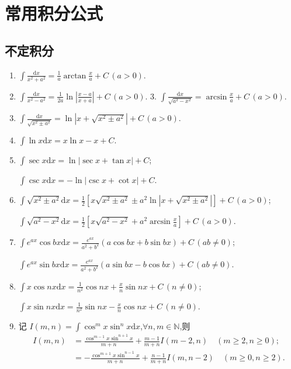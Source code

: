 \documentclass[../../main.tex]{subfiles}
\begin{document}
\section{常用积分公式}

\subsection{不定积分}

\begin{enumerate}
\item $\int\frac{\mathrm{d}x}{x^2+a^2}=\frac{1}{a}\arctan\frac{x}{a}+C\,(a>0)$.
\\
\item $\int\frac{\mathrm{d}x}{x^2-a^2}=\frac{1}{2a}\ln\left|\frac{x-a}{x+a}\right|+C\,(a>0)$.
3. $\int\frac{\mathrm{d}x}{\sqrt{a^2-x^2}}=\arcsin\frac{x}{a}+C\,(a>0)$.
\\
\item $\int\frac{\mathrm{d}x}{\sqrt{x^2\pm a^2}}=\ln\left|x+\sqrt{x^2\pm a^2}\right|+C\,(a>0)$.
\\
\item $\int\ln x\mathrm{d}x=x\ln x-x+C$.
\\
\item $\int\sec x\mathrm{d}x=\ln|\sec x+\tan x|+C$;

$\int\csc x\mathrm{d}x=-\ln|\csc x+\cot x|+C$.
\\
\item $\int\sqrt{x^2\pm a^2}\mathrm{d}x=\frac{1}{2}\left[x\sqrt{x^2\pm a^2}\pm a^2\ln\left|x+\sqrt{x^2\pm a^2}\right|\right]+C\,(a>0)$;

$\int\sqrt{a^2-x^2}\mathrm{d}x=\frac{1}{2}\left[x\sqrt{a^2-x^2}+a^2\arcsin\frac{x}{a}\right]+C\,(a>0)$.
\\
\item $\int e^{ax}\cos bx\mathrm{d}x=\frac{e^{ax}}{a^2+b^2}(a\cos bx+b\sin bx)+C\,(ab\neq0)$;

$\int e^{ax}\sin bx\mathrm{d}x=\frac{e^{ax}}{a^2+b^2}(a\sin bx-b\cos bx)+C\,(ab\neq0)$.
\\
\item $\int x\cos nx\mathrm{d}x=\frac{1}{n^2}\cos nx+\frac{x}{n}\sin nx+C\,(n\neq0)$;

$\int x\sin nx\mathrm{d}x=\frac{1}{n^2}\sin nx-\frac{x}{n}\cos nx+C\,(n\neq0)$.
\\
\item 记 $I(m,n)=\int\cos^m x\sin^n x\mathrm{d}x$,$\forall n,m\in\mathbb{N}$,则
$$
\begin{aligned}
I(m,n)&=\frac{\cos^{m-1}x\sin^{n+1}x}{m+n}+\frac{m-1}{m+n}I(m-2,n)\quad(m\geqslant 2,n\geqslant 0);\\
&=-\frac{\cos^{m+1}x\sin^{n-1}x}{m+n}+\frac{n-1}{m+n}I(m,n-2)\quad(m\geqslant 0,n\geqslant 2).
\end{aligned}
$$
\end{enumerate}
\end{document}

